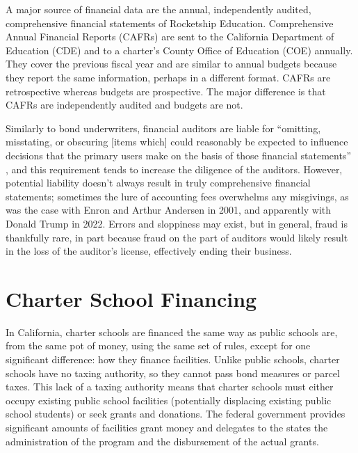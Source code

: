 A major source of financial data are the annual, independently audited, comprehensive financial statements of Rocketship Education. Comprehensive Annual Financial Reports (CAFRs) are sent to the California Department of Education (CDE) and to a charter's County Office of Education (COE) annually. They cover the previous fiscal year and are similar to annual budgets because they report the same information, perhaps in a different format. CAFRs are retrospective whereas budgets are prospective. The major difference is that CAFRs are independently audited and budgets are not. 

Similarly to bond underwriters, financial auditors are liable for ``omitting, misstating, or obscuring [items which] could reasonably be expected to influence decisions that the primary users make on the basis of those financial statements'' \parencite{Cayamanda2020}, and this requirement tends to increase the diligence of the auditors. However, potential liability doesn't always result in truly comprehensive financial statements; sometimes the lure of accounting fees overwhelms any misgivings, as was the case with Enron and Arthur Andersen in 2001, and apparently with Donald Trump in 2022. Errors and sloppiness may exist, but in general, fraud is thankfully rare, in part because fraud on the part of auditors would likely result in the loss of the auditor's license, effectively ending their business. 

\section{Charter School Financing}\label{sec:charter-school-financing}\indent

In California, charter schools are financed the same way as public schools are, from the same pot of money, using the same set of rules, except for one significant difference: how they finance facilities. Unlike public schools, charter schools have no taxing authority, so they cannot pass bond measures or parcel taxes. This lack of a taxing authority means that charter schools must either occupy existing public school facilities (potentially displacing existing public school students) or seek grants and donations. The federal government provides significant amounts of facilities grant money and delegates to the states the administration of the program and the disbursement of the actual grants.

